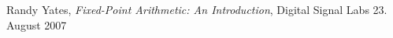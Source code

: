 \documentclass[12pt,a4paper]{article}
\begin{document}




%
%
%
%
%
\renewcommand{\refname}{\normalfont\selectfont\normalsize Kildeliste} 
\begin{thebibliography}{9}

   Randy Yates,
  \emph{Fixed-Point Arithmetic: An Introduction},
   Digital Signal Labs
  23. August
  2007

\end{thebibliography}
\end{document}
